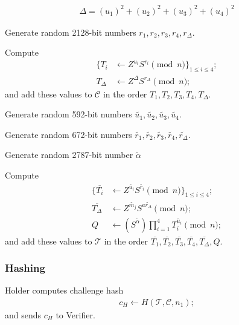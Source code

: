 \documentclass[a4paper]{article}
\begin{document}
\begin{legal}
\begin{legal}
\begin{align}
\Delta = (u_1)^2+ (u_2)^2+ (u_3)^2+ (u_4)^2
\end{align}
\item Generate random 2128-bit numbers $r_1,r_2,r_3,r_4, r_{\Delta}$.
\item Compute
\begin{align}
\{T_i &\leftarrow Z^{u_i}S^{r_i} \pmod{n}\}_{1 \leq i \leq 4};\\
T_{\Delta} &\leftarrow  Z^{\Delta}S^{r_{\Delta}} \pmod{n};
\end{align}
and add these values to $\mathcal{C}$ in the order $T_1,T_2,T_3,T_4,T_{\Delta}$.
\item Generate random 592-bit numbers $\widetilde{u_1},\widetilde{u_2},\widetilde{u_3},\widetilde{u_4}$.
\item Generate random 672-bit numbers $\widetilde{r_1},\widetilde{r_2},\widetilde{r_3},\widetilde{r_4},\widetilde{r_{\Delta}}$.
\item Generate random 2787-bit number $\widetilde{\alpha}$
\item Compute
\begin{align}
\{\overline{T_i} &\leftarrow Z^{\widetilde{u_i}}S^{\widetilde{r_i}}\pmod{n}\}_{1 \leq i \leq 4};\\
\overline{T_{\Delta}} &\leftarrow  Z^{\widetilde{m_j}}S^{a \widetilde{r_{\Delta}}} \pmod{n};\\
Q &\leftarrow (S^{\widetilde{\alpha}})\prod_{i=1}^{4}{T_i^{\widetilde{u_i}}}\pmod{n};
\end{align}
and add these values to $\mathcal{T}$ in the order $\overline{T_1},\overline{T_2},\overline{T_3},\overline{T_4}, \overline{T_{\Delta}},Q$.
\end{legal}
\end{legal}
\subsubsection{Hashing}\label{sec:hash}

Holder computes challenge hash
\begin{align}
c_H \leftarrow H(\mathcal{T},\mathcal{C},n_1);
\end{align}
and sends $c_H$ to Verifier.
\end{document}
